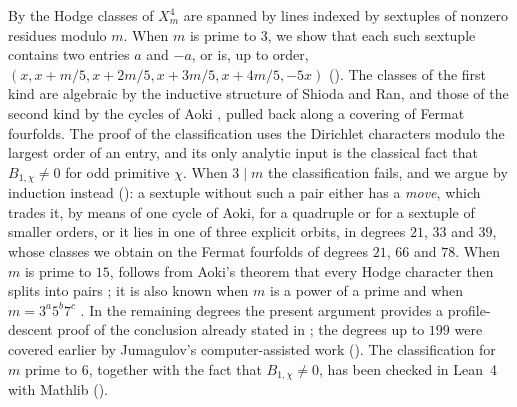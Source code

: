By  the Hodge classes of $X^{4}_{m}$ are spanned by
lines indexed by sextuples of nonzero residues modulo $m$. When $m$ is prime
to $3$, we show that each such sextuple contains two entries $a$ and $-a$,
or is, up to order, $(x,x+m/5,x+2m/5,x+3m/5,x+4m/5,-5x)$
(). The classes of
the first kind are algebraic by the inductive structure of Shioda and Ran,
and those of the second kind by the cycles of Aoki \cite{Aok87}, pulled back
along a covering of Fermat fourfolds. The proof of the classification uses
the Dirichlet characters modulo the largest order of an entry, and its only
analytic input is the classical fact that $B_{1,\chi}\ne0$ for odd primitive
$\chi$. When $3\mid m$ the classification fails, and we argue by induction
instead (): a sextuple without such a pair either has a
\emph{move}, which trades it, by means of one cycle of Aoki, for a quadruple
or for a sextuple of smaller orders, or it lies in one of three explicit
orbits, in degrees $21$, $33$ and $39$, whose classes we obtain on the
Fermat fourfolds of degrees $21$, $66$ and $78$. When $m$ is prime to $15$,
 follows from Aoki's theorem that every Hodge character then
splits into pairs \cite{Aok83}; it is also known when $m$ is a power of a
prime \cite{Aok87} and when $m=3^{a}5^{b}7^{c}$ \cite{Aok00,Pet26}. In the
remaining degrees the present argument provides a profile-descent
proof of the conclusion already stated in \cite{Li26a}; the degrees
up to $199$ were covered earlier by Jumagulov's computer-assisted
work (). The classification for $m$ prime to $6$, together
with the fact that $B_{1,\chi}\ne0$, has been checked in Lean~4 with Mathlib
().


